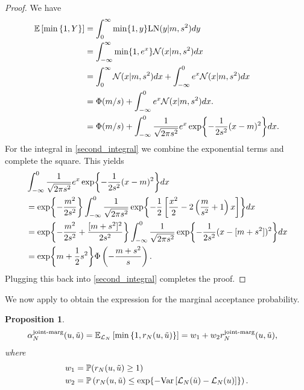 \documentclass[12pt]{article}
\newtheorem{prop}{Proposition}
\begin{document}
\begin{proof}
We have 
\begin{align}
\E\left[\min\left\{1, Y \right\} \right]
&= \int_{0}^{\infty} \min\{1, y\} \LN(y | m, s^2) dy \nonumber \\
&= \int_{-\infty}^{\infty} \min\{1, e^x\} \Gaussian(x | m, s^2) dx \nonumber \\
&= \int_{0}^{\infty} \Gaussian(x | m, s^2) dx +  \int_{-\infty}^{0} e^x \Gaussian(x | m, s^2) dx \nonumber \\
&= \GaussianCDF(m/s) + \int_{-\infty}^{0} e^x \Gaussian(x | m, s^2) dx. \nonumber \\
&= \GaussianCDF(m/s) + \int_{-\infty}^{0} \frac{1}{\sqrt{2\pi s^2}} e^x \Exp{-\frac{1}{2s^2} (x - m)^2} dx.  
\label{second_integral} 
\end{align}
For the integral in \ref{second_integral} we combine the exponential terms and complete the square. 
This yields 
\begin{align*}
&\int_{-\infty}^{0} \frac{1}{\sqrt{2\pi s^2}} e^x \Exp{-\frac{1}{2s^2} (x - m)^2} dx \\
&= \Exp{-\frac{m^2}{2s^2}} \int_{-\infty}^{0} \frac{1}{\sqrt{2\pi s^2}} \Exp{-\frac{1}{2} \left[\frac{x^2}{2} - 2\left(\frac{m}{s^2} + 1\right)x  \right]} dx \\
&= \Exp{-\frac{m^2}{2s^2} + \frac{[m + s^2]^2}{2s^2}} \int_{-\infty}^{0} \frac{1}{\sqrt{2\pi s^2}} \Exp{-\frac{1}{2s^2}(x - [m+s^2])^2} dx \\
&= \Exp{m + \frac{1}{2}s^2} \GaussianCDF\left(-\frac{m+s^2}{s}\right).
\end{align*}
Plugging this back into \ref{second_integral} completes the proof. 
\end{proof}

We now apply  to obtain the expression for the marginal acceptance probability. 
\begin{prop} \label{prop:joint-marg-accept-prob}
\begin{align*}
\llikEmJointMarg[\Ndesign]{\accProbMH}(\Par, \propPar) 
&= \E_{\llikEm[\Ndesign]} \left[\min\left\{1, \Em[\Ndesign]{\accProbRatio}(\Par, \propPar)\right\} \right] 
= w_1 + w_2 \llikEmJointMarg[\Ndesign]{\accProbRatio}(\Par, \propPar), 
\end{align*}
where 
\begin{align*}
w_1 &= \Prob(\Em[\Ndesign]{\accProbRatio}(\Par, \propPar) \geq 1) \\
w_2 &= \Prob\left(\Em[\Ndesign]{\accProbRatio}(\Par, \propPar) \leq \Exp{-\Var\left[\llikEm[\Ndesign](\propPar) - \llikEm[\Ndesign](\Par) \right]}\right).
\end{align*}
\end{prop}
\end{document}
